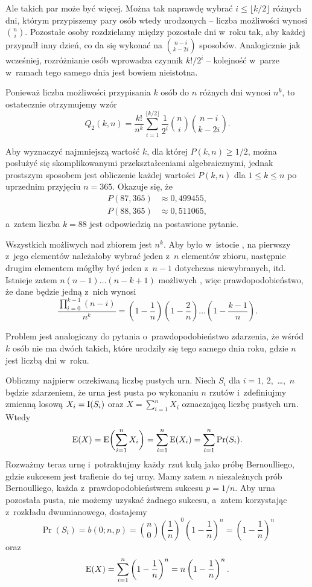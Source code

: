 Ale takich par może być więcej. Można tak naprawdę wybrać $i\le\lfloor k/2\rfloor$ różnych dni, którym przypiszemy pary osób wtedy urodzonych -- liczba możliwości wynosi $\binom{n}{i}$. Pozostałe osoby rozdzielamy między pozostałe dni w~roku tak, aby każdej przypadł inny dzień, co da się wykonać na $\binom{n-i}{k-2i}$ sposobów. Analogicznie jak wcześniej, rozróżnianie osób wprowadza czynnik $k!/2^i$ -- kolejność w~parze w~ramach tego samego dnia jest bowiem nieistotna.

Ponieważ liczba możliwości przypisania $k$ osób do $n$ różnych dni wynosi $n^k$, to ostatecznie otrzymujemy wzór
\[
	Q_2(k,n) = \frac{k!}{n^k}\sum_{i=1}^{\lfloor k/2\rfloor}\frac{1}{2^i}\binom{n}{i}\binom{n-i}{k-2i}.
\]

Aby wyznaczyć najmniejszą wartość $k$, dla której $P(k,n)\ge1/2$, można posłużyć się skomplikowanymi przekształceniami algebraicznymi, jednak prostszym sposobem jest obliczenie każdej wartości $P(k,n)$ dla $1\le k\le n$ po uprzednim przyjęciu $n=365$. Okazuje się, że
\begin{align*}
	P(87,365) &\approx 0{,}499455, \\
	P(88,365) &\approx 0{,}511065,
\end{align*}
a~zatem liczba $k=88$ jest odpowiedzią na postawione pytanie.

\exercise %
Wszystkich możliwych  nad zbiorem  jest $n^k$. Aby  było w~istocie , na pierwszy z~jego elementów należałoby wybrać jeden z~$n$ elementów zbioru, następnie drugim elementem mógłby być jeden z~$n-1$ dotychczas niewybranych, itd. Istnieje zatem $n(n-1)\dots(n-k+1)$ możliwych , więc prawdopodobieństwo, że dane  będzie jedną z~nich wynosi
\[
	\frac{\prod_{i=0}^{k-1}(n-i)}{n^k} = \left(1-\frac{1}{n}\right)\left(1-\frac{2}{n}\right)\dots\left(1-\frac{k-1}{n}\right).
\]

Problem jest analogiczny do pytania o~prawdopodobieństwo zdarzenia, że wśród $k$ osób nie ma dwóch takich, które urodziły się tego samego dnia roku, gdzie $n$ jest liczbą dni w~roku.

\exercise %
Obliczmy najpierw oczekiwaną liczbę pustych urn. Niech $S_i$ dla $i=1$, 2,~\dots,~$n$ będzie zdarzeniem, że  urna jest pusta po wykonaniu $n$ rzutów i~zdefiniujmy zmienną losową $X_i=\operatorname{I}(S_i)$ oraz $X=\sum_{i=1}^nX_i$ oznaczającą liczbę pustych urn. Wtedy
\[
	\operatorname{E}(X) = \operatorname{E}\biggl(\sum_{i=1}^nX_i\biggr) = \sum_{i=1}^n\operatorname{E}(X_i) = \sum_{i=1}^n\Pr(S_i).
\]
Rozważmy teraz  urnę i~potraktujmy każdy rzut kulą jako próbę Bernoulliego, gdzie sukcesem jest trafienie do tej urny. Mamy zatem $n$ niezależnych prób Bernoulliego, każda z~prawdopodobieństwem sukcesu $p=1/n$. Aby  urna pozostała pusta, nie możemy uzyskać żadnego sukcesu, a~zatem korzystając z~rozkładu dwumianowego, dostajemy
\[
	\Pr(S_i) = b(0;n,p) = \binom{n}{0}\left(\frac{1}{n}\right)^0\left(1-\frac{1}{n}\right)^n = \left(1-\frac{1}{n}\right)^n
\]
oraz
\[
	\operatorname{E}(X) = \sum_{i=1}^n\left(1-\frac{1}{n}\right)^n = n\left(1-\frac{1}{n}\right)^n.
\]

